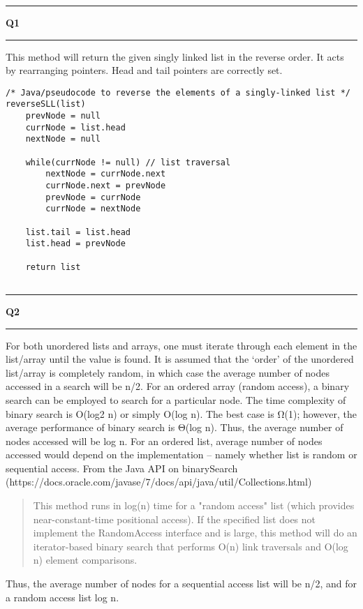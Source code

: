 \documentclass[11pt]{article}
\newcommand\question[2]{\vspace{.25in}\hrule\textbf{#1 #2}\vspace{.5em}\hrule\vspace{.10in}}
\begin{document}
\raggedright
\newcommand\NAME{Sean Connor}  %
\newcommand\HWNUM{4}              %

\question{Q1}{}
This method will return the given singly linked list in the reverse order. It acts by rearranging pointers. Head and tail pointers are correctly set.
\begin{lstlisting}
/* Java/pseudocode to reverse the elements of a singly-linked list */
reverseSLL(list)
	prevNode = null
	currNode = list.head
	nextNode = null

	while(currNode != null) // list traversal
		nextNode = currNode.next
		currNode.next = prevNode
		prevNode = currNode
		currNode = nextNode

	list.tail = list.head
	list.head = prevNode

	return list
    
\end{lstlisting}

\question{Q2}{}
For both unordered lists and arrays, one must iterate through each element in the list/array until the value is found. It is assumed that the ‘order’ of the unordered list/array is completely random, in which case the average number of nodes accessed in a search will be n/2.
\newline
\newline
For an ordered array (random access), a binary search can be employed to search for a particular node. The time complexity of binary search is O(log2 n) or simply O(log n).  The best case is Ω(1); however, the average performance of binary search is Θ(log n). Thus, the average number of nodes accessed will be log n.
\newline
\newline
For an ordered list, average number of nodes accessed would depend on the implementation – namely whether list is random or sequential access. From the Java API on binarySearch (https://docs.oracle.com/javase/7/docs/api/java/util/Collections.html)
\begin{quotation}
This method runs in log(n) time for a "random access" list (which provides near-constant-time positional access). If the specified list does not implement the RandomAccess interface and is large, this method will do an iterator-based binary search that performs O(n) link traversals and O(log n) element comparisons.
\end{quotation}
Thus, the average number of nodes for a sequential access list will be n/2, and for a random access list log n. 
\end{document}
